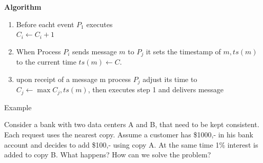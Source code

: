 \documentclass[ngerman,a4paper]{report}
\begin{document}
\textbf{Algorithm}
\begin{enumerate}
\item Before eacht event $P_1$ executes\\
$C_i \leftarrow C_i + 1$
\item When Process $P_i$ sends message $m$ to $P_j$ it sets the timestamp of $m, ts(m)$ to the current time $ts(m) \leftarrow C$.
\item upon receipt of a message m process $P_j$ adjust its time to $C_j \leftarrow \max{C_j, ts(m)}$, then executes step 1 and delivers message
\end{enumerate}
Example

Consider a bank with two data centers A and B, that need to be kept consistent. Each request uses the nearest copy.
Assume a customer has \$1000,- in his bank account and decides to add \$100,- using copy A. At the same time 1\% interest is added to copy B. What happens? How can we solve the problem?
\end{document}
